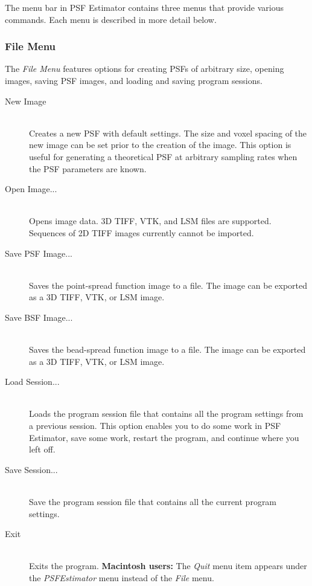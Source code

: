 \documentclass[11pt,titlepage,twoside]{article}
\begin{document}
The menu bar in PSF Estimator contains three menus that provide various commands. Each menu is described in more detail below.

\subsubsection{File Menu}

The \emph{File Menu} features options for creating PSFs of arbitrary size, opening images, saving PSF images, and loading and saving program sessions.

\begin{description}
  \item[New Image] \hfill \\
  Creates a new PSF with default settings. The size and voxel spacing of the new image can be set prior to the creation of the image. This option is useful for generating a theoretical PSF at arbitrary sampling rates when the PSF parameters are known.

  \item[Open Image...] \hfill \\
  Opens image data. 3D TIFF, VTK, and LSM files are supported. Sequences of 2D TIFF images currently cannot be imported.

  \item[Save PSF Image...] \hfill \\
   Saves the point-spread function image to a file. The image can be exported as a 3D TIFF, VTK, or LSM image.
   
  \item[Save BSF Image...] \hfill \\
  Saves the bead-spread function image to a file. The image can be exported as a 3D TIFF, VTK, or LSM image.
  
  \item[Load Session...] \hfill \\
  Loads the program session file that contains all the program settings from a previous session. This option enables you to do some work in PSF Estimator, save some work, restart the program, and continue where you left off.
  
  \item[Save Session...] \hfill \\
  Save the program session file that contains all the current program settings.
  
  \item[Exit] \hfill \\
  Exits the program. \textbf{Macintosh users:} The \emph{Quit} menu item appears under the \emph{PSFEstimator} menu instead of the \emph{File} menu.

\end{description}
\end{document}
